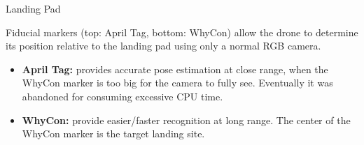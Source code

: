 \documentclass[final, 20pt]{beamer}
\newlength{\colwidth}
\begin{document}
\begin{frame}[t]
\begin{columns}[t]
\begin{column}{\colwidth}
  \begin{block}{Landing Pad}

    \begin{figure}
    \end{figure}

    Fiducial markers (top: April Tag\cite{apriltag_paper}, bottom: WhyCon\cite{whycon_paper}) allow the drone to determine its position relative to the landing pad using only a normal RGB camera.

    \begin{itemize}
      \item \textbf{April Tag:} provides accurate pose estimation at close range, when the WhyCon marker is too big for the camera to fully see. Eventually it was abandoned for consuming excessive CPU time.
      \item \textbf{WhyCon:} provide easier/faster recognition at long range. The center of the WhyCon marker is the target landing site.
    \end{itemize}



\end{block}
\end{column}
\end{columns}
\end{frame}
\end{document}
